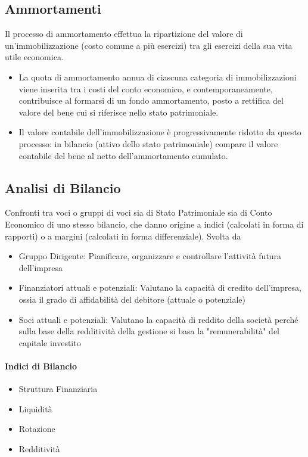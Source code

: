 \documentclass[12pt]{article}
\begin{document}
\subsection{Ammortamenti}
Il processo di ammortamento effettua la ripartizione del valore di un’immobilizzazione (costo comune a più esercizi) tra gli esercizi della sua vita utile economica.
\begin{itemize}
    \item La quota di ammortamento annua di ciascuna categoria di immobilizzazioni viene inserita tra i costi del conto economico, e contemporaneamente, contribuisce al formarsi di un fondo ammortamento, posto a rettifica del valore del bene cui si riferisce nello stato patrimoniale.
    \item Il valore contabile dell’immobilizzazione è progressivamente ridotto da questo processo: in bilancio (attivo dello stato patrimoniale) compare il valore contabile del bene al netto dell’ammortamento cumulato.
\end{itemize}
\subsection{Analisi di Bilancio}
Confronti tra voci o gruppi di voci sia di Stato Patrimoniale sia di Conto Economico di uno stesso bilancio, che danno origine a indici (calcolati in forma di rapporti) o a margini (calcolati in forma differenziale). Svolta da
\begin{itemize}
    \item Gruppo Dirigente: Pianificare, organizzare e controllare l’attività futura dell’impresa
    \item Finanziatori attuali e potenziali: Valutano la capacità di credito dell’impresa, ossia il grado di affidabilità del debitore (attuale o potenziale)
    \item Soci attuali e potenziali: Valutano la capacità di reddito della società perché sulla base della redditività della gestione si basa la "remunerabilità" del capitale investito
\end{itemize}
\paragraph{Indici di Bilancio}
\begin{itemize}
    \item Struttura Finanziaria
    \item Liquidità
    \item Rotazione
    \item Redditività
\end{itemize}
\end{document}
